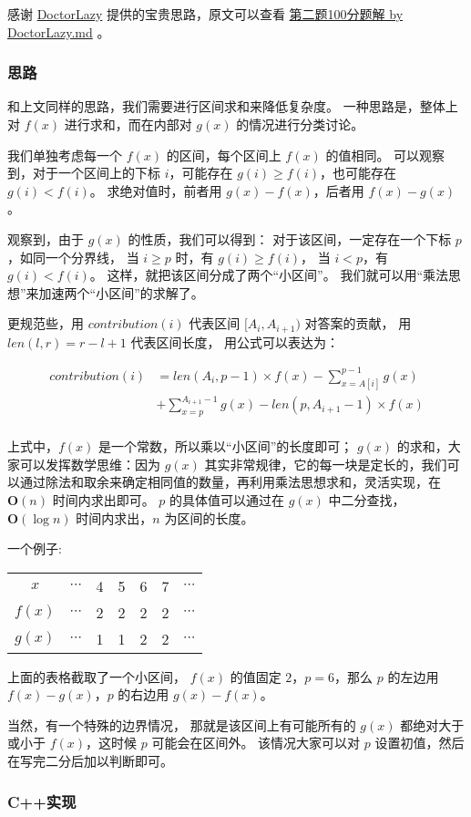 感谢 \href{https://github.com/DoctorLazy}{DoctorLazy}
提供的宝贵思路，原文可以查看 \href{https://github.com/DoctorLazy}{第二题100分题解 by DoctorLazy.md}
。

\subsubsection{思路}

和上文同样的思路，我们需要进行区间求和来降低复杂度。
一种思路是，整体上对 $f(x)$ 进行求和，而在内部对 $g(x)$ 的情况进行分类讨论。

我们单独考虑每一个 $f(x)$ 的区间，每个区间上 $f(x)$ 的值相同。
可以观察到，对于一个区间上的下标 $i$，可能存在 $g(i)\ge f(i)$，也可能存在 $g(i)<f(i)$。
求绝对值时，前者用 $g(x)-f(x)$，后者用 $f(x)-g(x)$。

观察到，由于 $g(x)$ {}的性质，我们可以得到：
对于该区间，一定存在一个下标 $p$，如同一个分界线，
当 $i\ge p$ 时，有 $g(i)\ge f(i)$，
当 $i<p$，有 $g(i)<f(i)$。
这样，就把该区间分成了两个“小区间”。
我们就可以用“乘法思想”来加速两个“小区间”的求解了。

更规范些，用 $contribution(i)$ 代表区间 $[A_i, A_{i+1})$ 对答案的贡献，
用 $len(l, r) = r - l + 1$ 代表区间长度，
用公式可以表达为：

\begin{align*}
    contribution(i) & =len(A_i,p-1)\times f(x)-\sum_{x=A[i]}^{p-1}g(x)         \\
                    & +\sum_{x=p}^{A_{i+1}-1}g(x)- len(p,A_{i+1}-1)\times f(x) \\
\end{align*}

上式中，$f(x)$ 是一个常数，所以乘以“小区间”的长度即可；
$g(x)$ 的求和，大家可以发挥数学思维：因为 $g(x)$ 其实非常规律，它的每一块是定长的，我们可以通过除法和取余来确定相同值的数量，再利用乘法思想求和，灵活实现，在 $\mathbf{O}(n)$ 时间内求出即可。
$p$ 的具体值可以通过在 $g(x)$ 中二分查找，$\mathbf{O}(\log n)$ 时间内求出，$n$ 为区间的长度。

一个例子:

\begin{table}[H]
    \centering
    \begin{tabular}{ccccccc}
        \toprule
        $x$    & $\cdots$ & 4 & 5 & 6 & 7 & $\cdots$ \\
        $f(x)$ & $\cdots$ & 2 & 2 & 2 & 2 & $\cdots$ \\
        $g(x)$ & $\cdots$ & 1 & 1 & 2 & 2 & $\cdots$ \\
        \bottomrule
    \end{tabular}
\end{table}

上面的表格截取了一个小区间，
$f(x)$ 的值固定 $2$，$p=6$，那么 $p$ 的左边用 $f(x)-g(x)$，$p$ 的右边用 $g(x)-f(x)$。

当然，有一个特殊的边界情况，
那就是该区间上有可能所有的 $g(x)$ 都绝对大于或小于 $f(x)$，这时候 $p$ 可能会在区间外。
该情况大家可以对 $p$ 设置初值，然后在写完二分后加以判断即可。

\subsubsection{C++实现}

